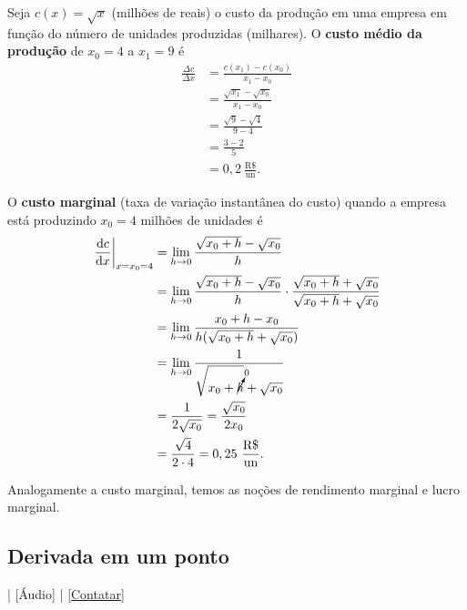 \begin{ex}
  Seja $c(x) = \sqrt{x}$ (milhões de reais) o custo da produção em uma empresa em função do número de unidades produzidas (milhares). O {\bf custo médio da produção} de $x_0=4$ a $x_1=9$ é
  \begin{align}
    \frac{\Delta c}{\Delta x} &= \frac{c(x_1)-c(x_0)}{x_1-x_0}\\
                              &= \frac{\sqrt{x_1}-\sqrt{x_0}}{x_1-x_0}\\
                              &= \frac{\sqrt{9}-\sqrt{4}}{9-4}\\
                              &= \frac{3-2}{5} \\
                              &= 0,2~\frac{\text{R\$}}{\text{un}}.
  \end{align}

  O {\bf custo marginal} (taxa de variação instantânea do custo) quando a empresa está produzindo $x_0=4$ milhões de unidades é
  \begin{align}
    \left.\frac{\mathrm{d} c}{\mathrm{d} x}\right|_{x=x_0=4} &= \lim_{h\to 0} \frac{\sqrt{x_0+h}-\sqrt{x_0}}{h}\\
                                               &= \lim_{h\to 0} \frac{\sqrt{x_0+h}-\sqrt{x_0}}{h}\cdot \frac{\sqrt{x_0+h}+\sqrt{x_0}}{\sqrt{x_0+h}+\sqrt{x_0}}\\
                                               &= \lim_{h\to 0} \frac{x_0+h-x_0}{h(\sqrt{x_0+h}+\sqrt{x_0})}\\
                                               &= \lim_{h\to 0} \frac{1}{\sqrt{x_0+\cancelto{0}{h}}+\sqrt{x_0}}\\
                                               &= \frac{1}{2\sqrt{x_0}} = \frac{\sqrt{x_0}}{2x_0}\\
                                               &= \frac{\sqrt{4}}{2\cdot 4} = 0,25~\frac{\text{R\$}}{\text{un}}.
  \end{align}
\end{ex}

\begin{obs}
  Analogamente a custo marginal, temos as noções de rendimento marginal e lucro marginal.
\end{obs}

\subsection{Derivada em um ponto}

\begin{flushright}
  [Vídeo] | [Áudio] | \href{https://phkonzen.github.io/notas/contato.html}{[Contatar]}
\end{flushright}


